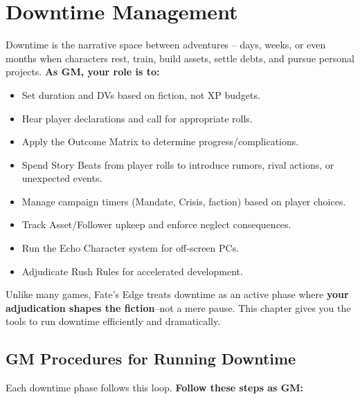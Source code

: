 \chapter{Downtime Management}
\label{ch:downtime}

Downtime is the narrative space between adventures -- days, weeks, or even months when characters rest, train, build assets, settle debts, and pursue personal projects. \textbf{As GM, your role is to:}  
\begin{itemize}
  \item Set duration and DVs based on fiction, not XP budgets.
  \item Hear player declarations and call for appropriate rolls.
  \item Apply the Outcome Matrix to determine progress/complications.
  \item Spend Story Beats from player rolls to introduce rumors, rival actions, or unexpected events.
  \item Manage campaign timers (Mandate, Crisis, faction) based on player choices.
  \item Track Asset/Follower upkeep and enforce neglect consequences.
  \item Run the Echo Character system for off-screen PCs.
  \item Adjudicate Rush Rules for accelerated development.
\end{itemize}
Unlike many games, Fate's Edge treats downtime as an active phase where \textbf{your adjudication shapes the fiction}--not a mere pause. This chapter gives you the tools to run downtime efficiently and dramatically.

\section{GM Procedures for Running Downtime}
\label{sec:gm-downtime-procedures}
Each downtime phase follows this loop. \textbf{Follow these steps as GM:}  

